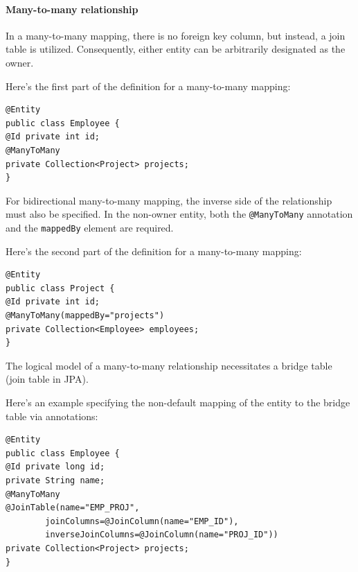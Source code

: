 \paragraph*{Many-to-many relationship}
In a many-to-many mapping, there is no foreign key column, but instead, a join table is utilized. 
Consequently, either entity can be arbitrarily designated as the owner.
\begin{example}
    Here's the first part of the definition for a many-to-many mapping:
    \begin{lstlisting}[style=Java]
@Entity
public class Employee {
@Id private int id;
@ManyToMany
private Collection<Project> projects;
}
    \end{lstlisting}
\end{example}
For bidirectional many-to-many mapping, the inverse side of the relationship must also be specified. 
In the non-owner entity, both the \texttt{@ManyToMany} annotation and the \texttt{mappedBy} element are required.
\begin{example}
    Here's the second part of the definition for a many-to-many mapping:
    \begin{lstlisting}[style=Java]
@Entity
public class Project {
@Id private int id;
@ManyToMany(mappedBy="projects")
private Collection<Employee> employees;
}
    \end{lstlisting}
\end{example}
The logical model of a many-to-many relationship necessitates a bridge table (join table in JPA).
\begin{example}
    Here's an example specifying the non-default mapping of the entity to the bridge table via annotations:
    \begin{lstlisting}[style=Java]
@Entity
public class Employee {
@Id private long id;
private String name;
@ManyToMany
@JoinTable(name="EMP_PROJ",
        joinColumns=@JoinColumn(name="EMP_ID"),
        inverseJoinColumns=@JoinColumn(name="PROJ_ID"))
private Collection<Project> projects;
}
    \end{lstlisting}
\end{example}

